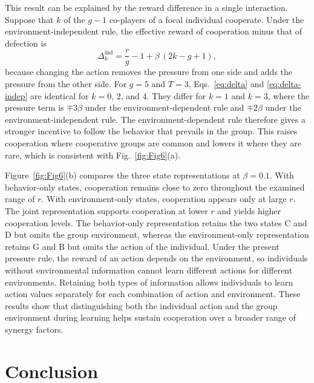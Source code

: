 \documentclass[%
  aip,cha,
  amsmath,amssymb,
  reprint,
  floatfix,
  article-title,
]{revtex4-2}
\begin{document}
This result can be explained by the reward difference in a single interaction. Suppose that $k$ of the $g-1$ co-players of a focal individual cooperate. Under the environment-independent rule, the effective reward of cooperation minus that of defection is
\begin{equation}
\Delta_k^{\mathrm{ind}}=\frac{r}{g}-1+\beta\,(2k-g+1),
\label{eq:delta-indep}
\end{equation}
because changing the action removes the pressure from one side and adds the pressure from the other side. For $g=5$ and $T=3$, Eqs.~\eqref{eq:delta} and \eqref{eq:delta-indep} are identical for $k=0$, $2$, and $4$. They differ for $k=1$ and $k=3$, where the pressure term is $\mp3\beta$ under the environment-dependent rule and $\mp2\beta$ under the environment-independent rule. The environment-dependent rule therefore gives a stronger incentive to follow the behavior that prevails in the group. This raises cooperation where cooperative groups are common and lowers it where they are rare, which is consistent with Fig.~\ref{fig:Fig6}(a).

Figure~\ref{fig:Fig6}(b) compares the three state representations at $\beta=0.1$. With behavior-only states, cooperation remains close to zero throughout the examined range of $r$. With environment-only states, cooperation appears only at large $r$. The joint representation supports cooperation at lower $r$ and yields higher cooperation levels. The behavior-only representation retains the two states $\mathrm{C}$ and $\mathrm{D}$ but omits the group environment, whereas the environment-only representation retains $\mathrm{G}$ and $\mathrm{B}$ but omits the action of the individual. Under the present pressure rule, the reward of an action depends on the environment, so individuals without environmental information cannot learn different actions for different environments. Retaining both types of information allows individuals to learn action values separately for each combination of action and environment. These results show that distinguishing both the individual action and the group environment during learning helps sustain cooperation over a broader range of synergy factors.


\section{Conclusion}\label{sec:conclusion}
\end{document}
